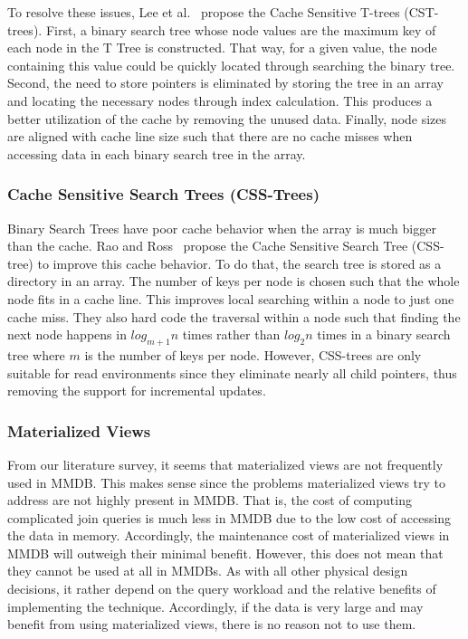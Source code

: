 \documentclass[12pt,a4paper]{article}
\begin{document}
To resolve these issues, Lee et al.~\cite{lee2007cst} propose the Cache Sensitive T-trees (CST-trees). First, a binary
search tree whose node values are the maximum key of each node in the T Tree is constructed. That way, for a given value, the node containing this value could
be quickly located through searching the binary tree. Second, the need to store pointers is eliminated by storing the tree in an array and locating the
necessary nodes through index calculation. This produces a better utilization of the cache by removing the unused data. Finally, node sizes are aligned with
cache line size such that there are no cache misses when accessing data in each
binary search tree in the array.

\subsubsection*{Cache Sensitive Search Trees (CSS-Trees)}

Binary Search Trees have poor cache behavior when the array is much bigger than the cache. Rao and Ross~\cite{rao1999cache} propose the Cache Sensitive Search
Tree (CSS-tree) to improve this cache behavior. To do that, the search tree is stored as a directory in an array. The number of keys per node is chosen such
that the whole node fits in a cache line. This improves local searching within a node to just one cache miss. They also hard code the traversal within a node
such that finding the next node happens in $log_{m+1}n$ times rather than $log_{2}n$ times in a binary search tree where $m$ is the number of keys per node.
However, CSS-trees are only suitable for read environments since they eliminate nearly all child pointers, thus removing the support for incremental updates.

\subsubsection{Materialized Views}
From our literature survey, it seems that materialized views are not frequently used in MMDB. This makes sense since the problems materialized views try to
address are not highly present in MMDB. That is, the cost of computing complicated join queries is much less in MMDB due to the low cost of accessing
the data in memory. Accordingly, the maintenance cost of materialized views in MMDB will outweigh their minimal benefit. However, this does not mean that they
cannot be used at all in MMDBs. As with all other physical design decisions, it rather depend on the query workload and the relative benefits of implementing
the technique. Accordingly, if the data is very large and may benefit from using materialized views, there is no reason not to use them.
\end{document}
